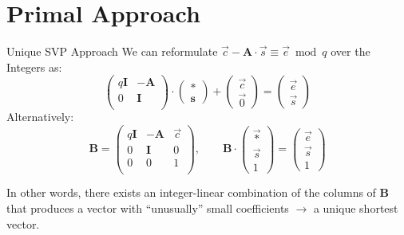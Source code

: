 \documentclass[xcolor=table,10pt,aspectratio=169]{beamer}
\begin{document}
\section{Primal Approach}
\label{sec:org0e84bdb}
\begin{frame}[label={sec:org0fa159d}]{Unique SVP Approach}
We can reformulate \(\vec{c} - \mathbf{A} \cdot \vec{s} \equiv \vec{e} \bmod q\)  over the Integers as:
\[
  \begin{pmatrix}
    q\mathbf{I} & -\mathbf{A}\\
    0 & \mathbf{I}\\
  \end{pmatrix} \cdot
  \begin{pmatrix}
    \mathbf{*}\\
    \mathbf{s}
  \end{pmatrix} +
  \begin{pmatrix}
    \vec{c}\\
    \vec{0}
  \end{pmatrix} = 
  \begin{pmatrix}
    \vec{e}\\
    \vec{s}
  \end{pmatrix}
\]
Alternatively:
\[
  \mathbf{B} = \begin{pmatrix}
    q\mathbf{I} & -\mathbf{A} & \vec{c}\\
    0 & \mathbf{I} & 0\\
    0 & 0 & 1\\
  \end{pmatrix}, \qquad
  \mathbf{B} \cdot
  \begin{pmatrix}
    \vec{*}\\
    \vec{s}\\
    1
  \end{pmatrix} = 
  \begin{pmatrix}
    \vec{e}\\
    \vec{s}\\
    1
  \end{pmatrix}
\]

In other words, there exists an integer-linear combination of the columns of \(\mathbf{B}\) that produces a vector with “unusually” small coefficients \(\rightarrow\) a unique shortest vector.
\end{frame}
\end{document}
